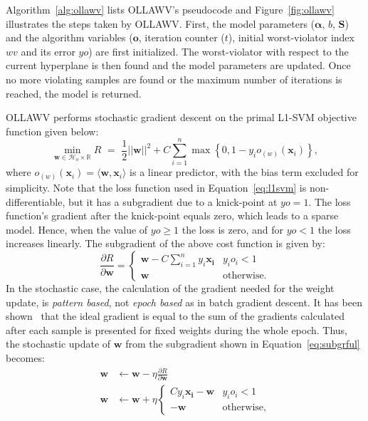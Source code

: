 \documentclass[reqno]{vcuthesis}
\newcommand{\set}[1]{{\left\{#1\right\}}}
\newcommand{\reals}{{\mathbb{R}}}
\numberwithin{equation}{chapter}
\begin{document}
Algorithm~\ref{alg:ollawv} lists OLLAWV's pseudocode and Figure~\ref{fig:ollawv} illustrates the steps taken by OLLAWV. First, the model parameters ($\bm \alpha$, $b$, $\bm S$) and the algorithm variables ($\bm o$, iteration counter ($t$), initial worst-violator index $wv$ and its error $yo$) are first initialized. The worst-violator with respect to the current hyperplane is then found and the model parameters are updated. Once no more violating samples are found or the maximum number of iterations is reached, the model is returned.

OLLAWV performs stochastic gradient descent on the primal L1-SVM objective function given below:
\begin{equation}
\label{eq:l1svm}
\min\limits_{\bm{w} \in \mathcal{H}_o \times \reals} R {\,\,} = {\,\,} \frac{1}{2}||\bm{w}||^2 + C\sum_{i=1}^n \max \set{0, 1 - y_i o_{(w)}(\bm{x}_i)},
\end{equation}
where $o_{(w)}(\bm{x}_i) = \langle\bm w, \bm x_i\rangle$ is a linear predictor, with the bias term excluded for simplicity. Note that the loss function used in Equation~\ref{eq:l1svm} is non-differentiable, but it has a subgradient due to a knick-point at $yo = 1$. The loss function's gradient after the knick-point equals zero, which leads to a sparse model. Hence, when the value of $yo \geq 1$ the loss is zero, and for $yo < 1$ the loss increases linearly. The subgradient of the above cost function is given by:
\begin{equation}
\label{eq:subgrful}
\frac{\partial R}{\partial \bm w} = \begin{cases} 
						\bm w - C \sum_{i=1}^n y_i \bm{x_i} & y_i o_i < 1 \\
						\bm w & \text{otherwise.}
						\end{cases}
\end{equation}
In the stochastic case, the calculation of the gradient needed for the weight update, is \textit{pattern based}, not \textit{epoch based} as in batch gradient descent. It has been shown~\cite{Kecman2001} that the ideal gradient is equal to the sum of the gradients calculated after each sample is presented for fixed weights during the whole epoch. Thus, the stochastic update of $\bm w$ from the subgradient shown in Equation~\ref{eq:subgrful} becomes:
\begin{align*}
\bm w &\leftarrow \bm w - \eta \frac{\partial R}{\partial \bm w} \\
\bm w &\leftarrow \bm w + \eta \begin{cases} 
															C y_i \bm{x_i} - \bm w & y_i o_i < 1 \\
															-\bm w & \text{otherwise},
													 \end{cases}
\end{align*}
\end{document}
